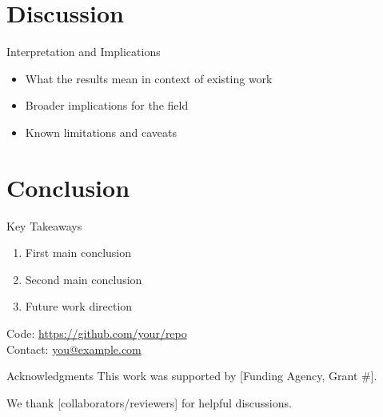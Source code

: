 \documentclass[aspectratio=169,11pt]{beamer}
\begin{document}
\section{Discussion}

\begin{frame}{Interpretation and Implications}
  \begin{itemize}
    \item What the results mean in context of existing work
    \item Broader implications for the field
    \item Known limitations and caveats
  \end{itemize}
\end{frame}

\section{Conclusion}

\begin{frame}{Key Takeaways}
  \begin{enumerate}
    \item First main conclusion
    \item Second main conclusion
    \item Future work direction
  \end{enumerate}
  \vfill
  \small
  Code: \url{https://github.com/your/repo} \\
  Contact: \href{mailto:you@example.com}{you@example.com}
\end{frame}


\begin{frame}{Acknowledgments}
  \small
  This work was supported by [Funding Agency, Grant \#].

  We thank [collaborators/reviewers] for helpful discussions.

\end{frame}

\end{document}
